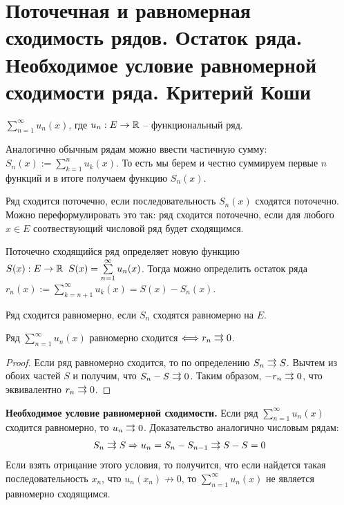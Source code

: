 \section{Поточечная и равномерная сходимость рядов. Остаток ряда. Необходимое условие равномерной сходимости ряда. Критерий Коши}
\begin{conj}
    $\sum\limits_{n = 1}^\infty u_n(x)$, где $u_n: E \to \mathbb{R}$ -- функциональный ряд.    
\end{conj} 
Аналогично обычным рядам можно ввести частичную сумму: $S_n(x) := \sum\limits_{k = 1}^n u_k(x)$.
То есть мы берем и честно суммируем первые $n$ функций и в итоге получаем функцию $S_n(x)$.
\begin{conj}
    Ряд сходится поточечно, если последовательность $S_n(x)$ сходятся поточечно.
    Можно переформулировать это так: ряд сходится поточечно, если для любого $x \in E$ соотвествующий числовой ряд будет сходящимся.

    Поточечно сходящийся ряд определяет новую функцию $S(x): E \to \mathbb{R} \;\; S(x) = \sum\limits_{n = 1}^\infty u_n(x)$.
    Тогда можно определить остаток ряда $r_n(x) := \sum\limits_{k = n + 1}^\infty u_k(x) = S(x) - S_n(x)$.
\end{conj}

\vspace*{5mm}

\begin{conj}
    Ряд сходится равномерно, если $S_n$ сходятся равномерно на $E$.
\end{conj}

\begin{theorem}
    Ряд $\sum\limits_{n = 1}^\infty u_n(x)$ равномерно сходится $\Longleftrightarrow r_n \doublerightarrow 0$. 
\end{theorem}
\begin{proof}
    Если ряд равномерно сходится, то по определению $S_n \doublerightarrow S$.
    Вычтем из обоих частей $S$ и получим, что $S_n - S \doublerightarrow 0$.
    Таким образом, $-r_n \doublerightarrow 0$, что эквивалентно $r_n \doublerightarrow 0$.
\end{proof}

\vspace*{5mm}

\textbf{Необходимое условие равномерной сходимости.} Если ряд $\sum\limits_{n = 1}^\infty u_n(x)$ сходится равномерно, то $u_n \doublerightarrow 0$.
Доказательство аналогично числовым рядам: 
\begin{gather*}
    S_n \doublerightarrow S \Rightarrow u_n = S_n - S_{n-1} \doublerightarrow S - S = 0
\end{gather*}
Если взять отрицание этого условия, то получится, что если найдется такая последовательность $x_n$, что $u_n(x_n) \nrightarrow 0$, то $\sum\limits_{n = 1}^\infty u_n(x)$ не является равномерно сходящимся.
    
